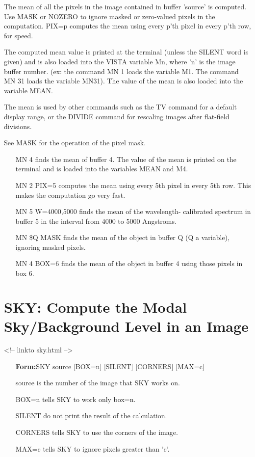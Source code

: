 The mean of all the pixels in the image contained in buffer 'source' is
computed.  Use MASK or NOZERO to ignore masked or zero-valued pixels in the
computation.  PIX=p computes the mean using every p'th pixel in every p'th
row, for speed.

The computed mean value is printed at the terminal (unless the SILENT word
is given) and is also loaded into the VISTA variable Mn, where 'n' is the
image buffer number. (ex: the command MN 1 loads the variable M1.  The
command MN 31 loads the variable MN31).  The value of the mean is also
loaded into the variable MEAN.

The mean is used by other commands such as the TV command for a default
display range, or the DIVIDE command for rescaling images after flat-field
divisions.

See MASK for the operation of the pixel mask.

\begin{itemize}
  \item[MN 4\hfill]{finds the mean of buffer 4.  The
  value of the mean is printed on the terminal and is loaded into the 
  variables MEAN and M4.}
  \item[MN 2 PIX=5\hfill]{computes the mean using every 5th 
  pixel in every 5th row.  This makes the computation go very fast.}
  \item[MN 5 W=4000,5000\hfill]{finds the mean of the wavelength-
  calibrated spectrum in buffer 5 in the interval from 4000 to 5000 Angstroms.}
  \item[MN \$Q MASK\hfill]{finds the mean of the object in buffer
  Q (Q a variable), ignoring masked pixels.}
  \item[MN 4 BOX=6\hfill]{finds the mean of the object in
  buffer 4 using those pixels in box 6.}
\end{itemize}

\section{SKY: Compute the Modal Sky/Background Level in an Image}
\begin{rawhtml}
<!-- linkto sky.html -->
\end{rawhtml}
\begin{itemize}
  \item[\textbf{Form:}SKY source {[BOX=n]} {[SILENT]} {[CORNERS]}
       {[MAX=c]}\hfill]{}
  \item[source]{is the number of the image that SKY works on.}
  \item[BOX=n]{tells SKY to work only box=n.}
  \item[SILENT]{do not print the result of the calculation.}
  \item[CORNERS]{tells SKY to use the corners of the image.}
  \item[MAX=c]{tells SKY to ignore pixels greater than 'c'.}
\end{itemize}

